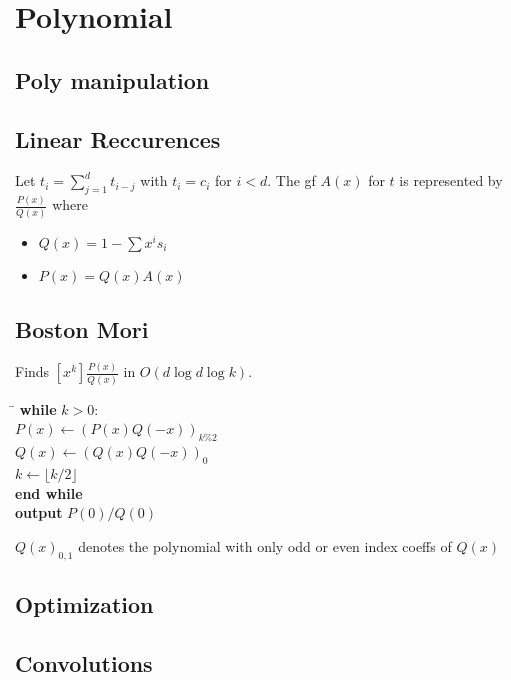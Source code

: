 \chapter{Polynomial}

\section{Poly manipulation}
\section{Linear Reccurences}    
Let $t_i = \sum_{j=1}^d t_{i-j}$ with $t_i = c_i$ for $i < d$. The gf $A(x)$ for $t$ is represented by $\frac{P(x)}{Q(x)}$ where 
\begin{itemize}
\item $Q(x) = 1 - \sum x^i s_i$
\item $P(x) = Q(x)A(x)$
\end{itemize}
\section{Boston Mori}
Finds $[x^k]\frac{P(x)}{Q(x)}$ in $O(d \log d \log k)$.
\begin{tabbing}
\quad \= \kill %
\textbf{while} $k > 0$: \\
\> $P(x) \gets (P(x)Q(-x))_{k\% 2}$ \\
\> $Q(x) \gets (Q(x)Q(-x))_{0}$ \\
\> $k \gets \lfloor k/2 \rfloor$ \\
\textbf{end while} \\
\textbf{output} $P(0) / Q(0)$
\end{tabbing}
$Q(x)_{0,1}$ denotes the polynomial with only odd or even index coeffs of $Q(x)$ 

\section{Optimization}
  
\section{Convolutions}
